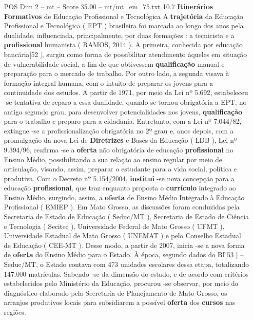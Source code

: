 \begin{textsample}{POS Dim 2 – mt – Score 35.00 – mt/mt\_em\_75.txt}  \label{ex:f2_pos_222}
10.7 \textbf{Itinerários} \textbf{Formativos} de Educação Profissional e Tecnológica A \textbf{trajetória} da Educação Profissional e Tecnológica ( EPT ) brasileira foi marcada ao longo dos anos pela dualidade, influenciada, principalmente, por duas formações : a tecnicista e a \textbf{profissional} humanista ( RAMOS, 2014 ).
A primeira, conhecida por educação bancária[52 ], surgiu como forma de possibilitar atendimento àqueles em situação de vulnerabilidade social, a fim de que obtivessem \textbf{qualificação} manual e preparação para o mercado de trabalho.
Por outro lado, a segunda visava à formação integral humana, com o intuito de preparar os jovens para a continuidade dos estudos.
A partir de 1971, por meio da Lei nº 5.692, estabeleceu -se tentativa de reparo a essa dualidade, quando se tornou obrigatória a EPT, no antigo segundo grau, para desenvolver potencialidades nos jovens, \textbf{qualificação} para o trabalho e preparo para a cidadania.
Entretanto, com a Lei nº 7.044/82, extingue -se a profissionalização obrigatória no 2º grau e, anos depois, com a promulgação da nova Lei de \textbf{Diretrizes} e Bases da Educação ( LDB ), Lei nº 9.394/96, reafirma -se a \textbf{oferta} não obrigatória de educação \textbf{profissional} no Ensino Médio, possibilitando a sua relação ao ensino regular por meio de articulação, visando, assim, preparar o estudante para a vida social, política e produtiva.
Com o Decreto nº 5.154/2004, \textbf{institui} -se nova concepção para a educação \textbf{profissional}, que traz enquanto proposta o \textbf{currículo} integrado ao Ensino Médio, surgindo, assim, a \textbf{oferta} de Ensino Médio Integrado à Educação Profissional ( EMIEP ).
Em Mato Grosso, as discussões foram conduzidas pela Secretaria de Estado de Educação ( Seduc/MT ), Secretaria de Estado de Ciência e Tecnologia ( Secitec ), Universidade Federal de Mato Grosso ( UFMT ), Universidade Estadual de Mato Grosso ( UNEMAT ) e pelo Conselho Estadual de Educação ( CEE-MT ).
Desse modo, a partir de 2007, inicia -se a nova forma de \textbf{oferta} do Ensino Médio para o Estado.
À época, segundo dados do BI[53 ] – Seduc/MT, o Estado contava com 473 unidades escolares dessa etapa, totalizando 147.000 matrículas.
Sabendo -se da dimensão do estado, e de acordo com critérios estabelecidos pelo Ministério da Educação, procurou -se observar, por meio do diagnóstico elaborado pela Secretaria de Planejamento de Mato Grosso, os arranjos produtivos locais para subsidiarem a possível \textbf{oferta} dos \textbf{cursos} nas regiões.

\end{textsample}
